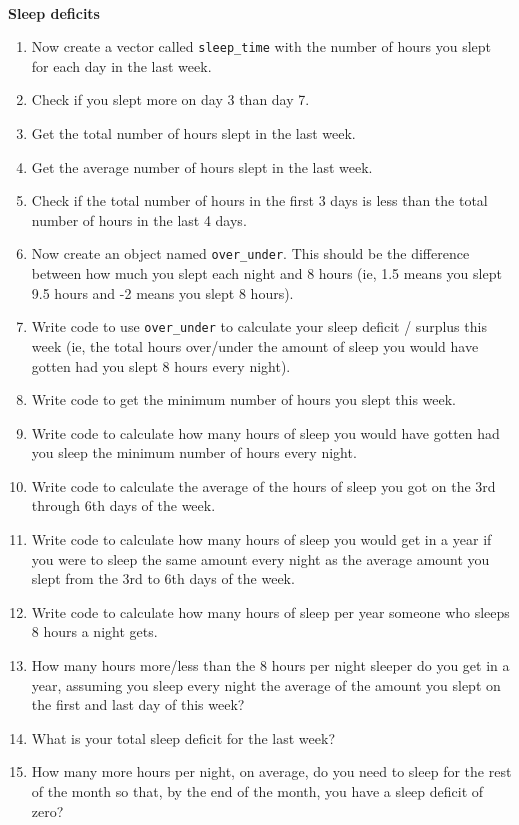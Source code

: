 \documentclass[
]{book}
\begin{document}
~

\textbf{Sleep deficits}

\begin{enumerate}
\def\labelenumi{\arabic{enumi}.}
\setcounter{enumi}{28}
\item
  Now create a vector called \texttt{sleep\_time} with the number of hours you slept for each day in the last week.
\item
  Check if you slept more on day 3 than day 7.
\item
  Get the total number of hours slept in the last week.
\item
  Get the average number of hours slept in the last week.
\item
  Check if the total number of hours in the first 3 days is less than the total number of hours in the last 4 days.
\item
  Now create an object named \texttt{over\_under}. This should be the difference between how much you slept each night and 8 hours (ie, 1.5 means you slept 9.5 hours and -2 means you slept 8 hours).
\item
  Write code to use \texttt{over\_under} to calculate your sleep deficit / surplus this week (ie, the total hours over/under the amount of sleep you would have gotten had you slept 8 hours every night).
\item
  Write code to get the minimum number of hours you slept this week.
\item
  Write code to calculate how many hours of sleep you would have gotten had you sleep the minimum number of hours every night.
\item
  Write code to calculate the average of the hours of sleep you got on the 3rd through 6th days of the week.
\item
  Write code to calculate how many hours of sleep you would get in a year if you were to sleep the same amount every night as the average amount you slept from the 3rd to 6th days of the week.
\item
  Write code to calculate how many hours of sleep per year someone who sleeps 8 hours a night gets.
\item
  How many hours more/less than the 8 hours per night sleeper do you get in a year, assuming you sleep every night the average of the amount you slept on the first and last day of this week?
\item
  What is your total sleep deficit for the last week?
\item
  How many more hours per night, on average, do you need to sleep for the rest of the month so that, by the end of the month, you have a sleep deficit of zero?
\end{enumerate}
\end{document}
